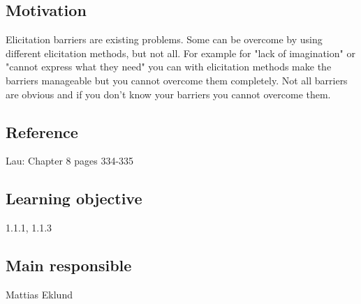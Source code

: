 \documentclass[a4paper]{article}
\begin{document}
\subsection*{Motivation}
Elicitation barriers are existing problems. Some can be overcome by using different elicitation methods, but not all. For example for "lack of imagination" or "cannot express what they need" you can with elicitation methods make the barriers manageable but you cannot overcome them completely. Not all barriers are obvious and if you don't know your barriers you cannot overcome them.
\subsection*{Reference}
Lau: Chapter 8 pages 334-335
\subsection*{Learning objective}
1.1.1, 1.1.3
\subsection*{Main responsible}
Mattias Eklund
\end{document}
